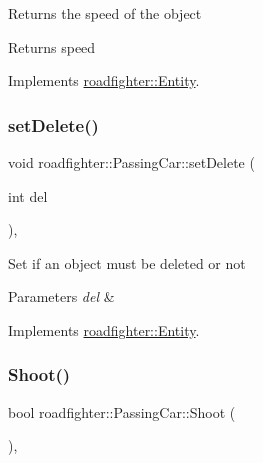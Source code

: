 Returns the speed of the object \begin{DoxyReturn}{Returns}
speed 
\end{DoxyReturn}


Implements \hyperlink{classroadfighter_1_1Entity_ad3760184d764a61922e1db7d98501ee4}{roadfighter\+::\+Entity}.

\mbox{\label{classroadfighter_1_1PassingCar_aad1905fcb427945c3300840deedffb1d}} 
\subsubsection{\texorpdfstring{set\+Delete()}{setDelete()}}
{\footnotesize\ttfamily void roadfighter\+::\+Passing\+Car\+::set\+Delete (\begin{DoxyParamCaption}\item[{int}]{del }\end{DoxyParamCaption})\hspace{0.3cm}{\ttfamily [override]}, {\ttfamily [virtual]}}

Set if an object must be deleted or not 
\begin{DoxyParams}{Parameters}
{\em del} & \\
\hline
\end{DoxyParams}


Implements \hyperlink{classroadfighter_1_1Entity_a07e973f0fa941a69e749629716877692}{roadfighter\+::\+Entity}.

\mbox{\label{classroadfighter_1_1PassingCar_a16df11cb6ac5ce29b733d1063490c95c}} 
\subsubsection{\texorpdfstring{Shoot()}{Shoot()}}
{\footnotesize\ttfamily bool roadfighter\+::\+Passing\+Car\+::\+Shoot (\begin{DoxyParamCaption}{ }\end{DoxyParamCaption})\hspace{0.3cm}{\ttfamily [override]}, {\ttfamily [virtual]}}

